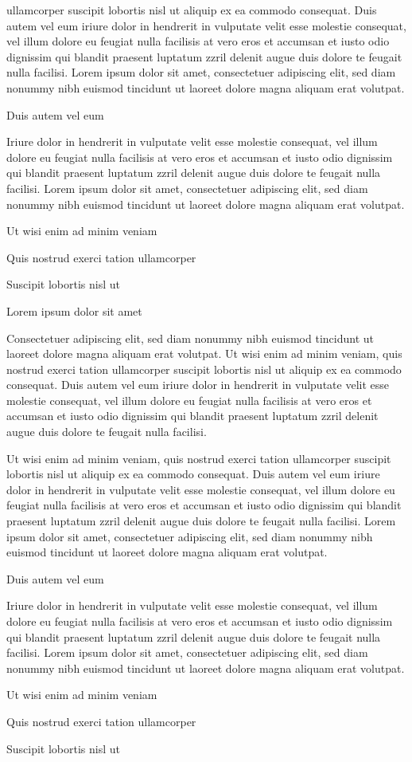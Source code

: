\documentclass[11pt]{article}\makeatletter
\begin{document}
      ullamcorper suscipit lobortis nisl ut aliquip ex ea commodo
      consequat. Duis autem vel eum iriure dolor in hendrerit in vulputate
      velit esse molestie consequat, vel illum dolore eu feugiat nulla
      facilisis at vero eros et accumsan et iusto odio dignissim qui blandit
      praesent luptatum zzril delenit augue duis dolore te feugait nulla
      facilisi. Lorem ipsum dolor sit amet, consectetuer adipiscing elit,
      sed diam nonummy nibh euismod tincidunt ut laoreet dolore magna
      aliquam erat volutpat. \par Duis autem vel eum \par Iriure dolor in hendrerit in vulputate velit esse molestie
      consequat, vel illum dolore eu feugiat nulla facilisis at vero eros et
      accumsan et iusto odio dignissim qui blandit praesent luptatum zzril
      delenit augue duis dolore te feugait nulla facilisi. Lorem ipsum dolor
      sit amet, consectetuer adipiscing elit, sed diam nonummy nibh euismod
      tincidunt ut laoreet dolore magna aliquam erat volutpat. \par Ut wisi enim ad minim veniam\par Quis nostrud exerci tation ullamcorper \par Suscipit lobortis nisl ut \par Lorem ipsum dolor sit amet\par Consectetuer adipiscing elit, sed diam nonummy nibh euismod
      tincidunt ut laoreet dolore magna aliquam erat volutpat. Ut wisi enim
      ad minim veniam, quis nostrud exerci tation ullamcorper suscipit
      lobortis nisl ut aliquip ex ea commodo consequat. Duis autem vel eum
      iriure dolor in hendrerit in vulputate velit esse molestie consequat,
      vel illum dolore eu feugiat nulla facilisis at vero eros et accumsan
      et iusto odio dignissim qui blandit praesent luptatum zzril delenit
      augue duis dolore te feugait nulla facilisi.\par Ut wisi enim ad minim veniam, quis nostrud exerci tation
      ullamcorper suscipit lobortis nisl ut aliquip ex ea commodo
      consequat. Duis autem vel eum iriure dolor in hendrerit in vulputate
      velit esse molestie consequat, vel illum dolore eu feugiat nulla
      facilisis at vero eros et accumsan et iusto odio dignissim qui blandit
      praesent luptatum zzril delenit augue duis dolore te feugait nulla
      facilisi. Lorem ipsum dolor sit amet, consectetuer adipiscing elit,
      sed diam nonummy nibh euismod tincidunt ut laoreet dolore magna
      aliquam erat volutpat. \par Duis autem vel eum \par Iriure dolor in hendrerit in vulputate velit esse molestie
      consequat, vel illum dolore eu feugiat nulla facilisis at vero eros et
      accumsan et iusto odio dignissim qui blandit praesent luptatum zzril
      delenit augue duis dolore te feugait nulla facilisi. Lorem ipsum dolor
      sit amet, consectetuer adipiscing elit, sed diam nonummy nibh euismod
      tincidunt ut laoreet dolore magna aliquam erat volutpat. \par Ut wisi enim ad minim veniam\par Quis nostrud exerci tation ullamcorper \par Suscipit lobortis nisl ut 
\end{document}
